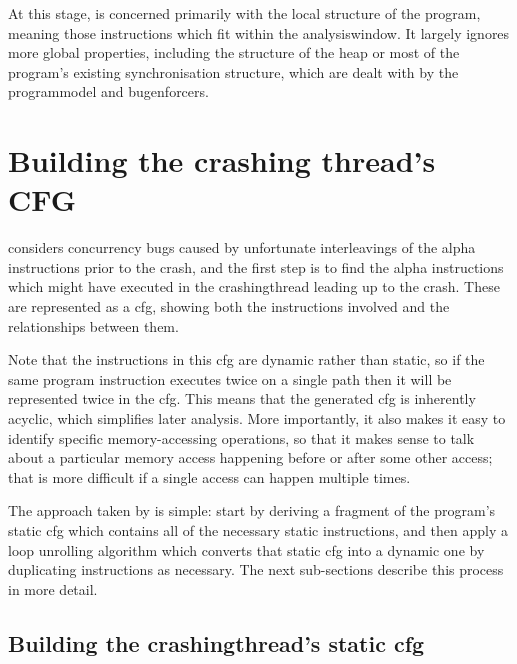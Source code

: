 At this stage, {\technique} is concerned primarily with the local
structure of the program, meaning those instructions which fit within
the \gls{analysiswindow}.  It largely ignores more global properties,
including the structure of the heap or most of the program's existing
synchronisation structure, which are dealt with by the
\gls{programmodel} and \glspl{bugenforcer}.

\section{Building the crashing thread's CFG}
\label{sect:derive:build_crashing_cfg}

{\Technique} considers concurrency bugs caused by unfortunate
interleavings of the \gls{alpha} instructions prior to the crash, and
the first step is to find the \gls{alpha} instructions which might
have executed in the \gls{crashingthread} leading up to the crash.
These are represented as a \gls{cfg}, showing both the instructions
involved and the relationships between them.

Note that the instructions in this \gls{cfg} are dynamic rather than
static, so if the same program instruction executes twice on a single
path then it will be represented twice in the \gls{cfg}.  This means
that the generated \gls{cfg} is inherently acyclic, which simplifies
later analysis.  More importantly, it also makes it easy to identify
specific memory-accessing operations, so that it makes sense to talk
about a particular memory access happening before or after some other
access; that is more difficult if a single access can happen multiple
times.

The approach taken by {\technique} is simple: start by deriving a
fragment of the program's static \gls{cfg} which contains all of the
necessary static instructions, and then apply a loop unrolling
algorithm which converts that static \gls{cfg} into a dynamic one by
duplicating instructions as necessary.  The next sub-sections describe
this process in more detail.

\subsection[Building the \glsentrytext{crashingthread}'s static \glsentrytext{cfg}]{Building the \gls{crashingthread}'s static \gls{cfg}}
\label{sect:derive:build_static_cfg}

